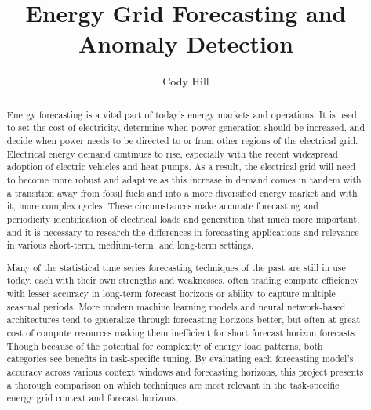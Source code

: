 \documentclass[sigconf]{acmart}
\begin{document}
\title{Energy Grid Forecasting and Anomaly Detection}


\author{Cody Hill}


\renewcommand{\shortauthors}{C. Hill}

\begin{abstract}
Energy forecasting is a vital part of today's energy markets and operations. It is used to set the cost of electricity, determine when power generation should be increased, and decide when power needs to be directed to or from other regions of the electrical grid. Electrical energy demand continues to rise, especially with the recent widespread adoption of electric vehicles and heat pumps. As a result, the electrical grid will need to become more robust and adaptive as this increase in demand comes in tandem with a transition away from fossil fuels and into a more diversified energy market and with it, more complex cycles. These circumstances make accurate forecasting and periodicity identification of electrical loads and generation that much more important, and it is necessary to research the differences in forecasting applications and relevance in various short-term, medium-term, and long-term settings.

Many of the statistical time series forecasting techniques of the past are still in use today, each with their own strengths and weaknesses, often trading compute efficiency with lesser accuracy in long-term forecast horizons or ability to capture multiple seasonal periods. More modern machine learning models and neural network-based architectures tend to generalize through forecasting horizons better, but often at great cost of compute resources making them inefficient for short forecast horizon forecasts. Though because of the potential for complexity of energy load patterns, both categories see benefits in task-specific tuning. By evaluating each forecasting model's accuracy across various context windows and forecasting horizons, this project presents a thorough comparison on which techniques are most relevant in the task-specific energy grid context and forecast horizons.
\end{abstract}
\end{document}
